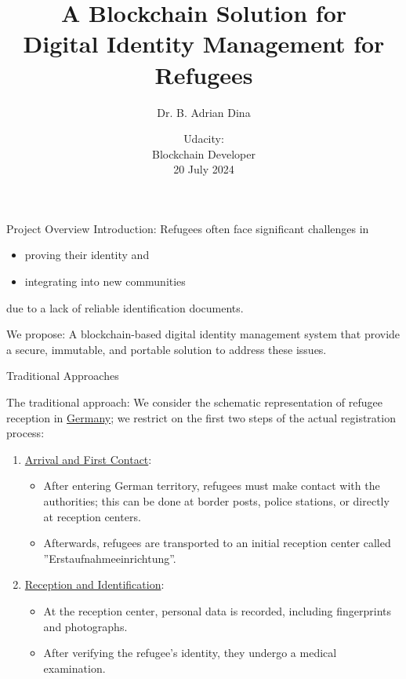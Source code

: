 \documentclass{beamer}
\title{A Blockchain Solution for\\ Digital Identity Management for Refugees}
\author[Adrian Dina]{Dr. B. Adrian Dina}
\date[Tel Aviv, 03/July/2024]{Udacity:\\ Blockchain Developer \\ 20 July 2024}
\begin{document}
\begin{frame}[plain]
  \titlepage
\end{frame}




\begin{frame}{Project Overview}
\alert{Introduction}: Refugees often face significant challenges in 
\vspace{-0.3cm}
\begin{itemize}
\item proving their identity and 
\item integrating into new communities 
\end{itemize}
\vspace{-0.2cm}
due to a lack of reliable identification documents. \newline

\alert{We propose}: A blockchain-based digital identity management system that provide a secure, immutable, and portable solution to address these issues.
\end{frame}



\begin{frame}{Traditional Approaches}

\alert{The traditional approach}: We consider the schematic representation of refugee reception in \underline{Germany}; we restrict on the first two steps of the actual registration process: 
\begin{enumerate}
\item \underline{Arrival and First Contact}:  
	\begin{itemize}
		\item After entering German territory, refugees must make contact with the authorities; this can be done at border posts, police stations, or directly at reception centers.
		\item Afterwards, refugees are transported to an initial reception center called ''Erstaufnahmeeinrichtung''.
	\end{itemize}
\item \underline{Reception and Identification}: 
	\begin{itemize}
		\item At the reception center, personal data is recorded, including fingerprints and photographs.
		\item After verifying the refugee's identity, they undergo a medical examination.
	\end{itemize}
\end{enumerate}

\end{frame}
\end{document}
